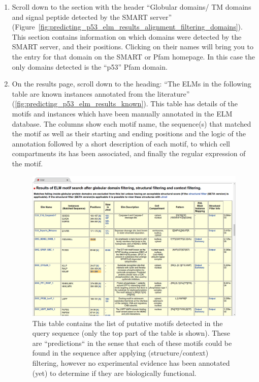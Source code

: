 \documentclass[12pt]{article}
\begin{document}
\begin{enumerate}
\item Scroll down to the section with the header ``Globular domains/ TM domains
	and signal peptide detected by the SMART server''
	(Figure~\ref{fig:predicting_p53_elm_results_alignment_filtering_domains}).
	This section contains information on which domains were detected by the
	SMART server, and their positions. Clicking on their names will bring
	you to the entry for that domain on the SMART or Pfam homepage.
	In this case the only domains detected is the ``p53'' Pfam domain.

\item On the results page, scroll down to the heading: ``The ELMs in the
	following table are known instances annotated from the literature''
	(\ref{fig:predicting_p53_elm_results_known}).
	This table has details of the motifs and instances which have been
	manually annotated in the ELM database. The columns show each motif
	name, the sequence(s) that matched the motif as well as their starting
	and ending positions and the logic of the annotation followed by a
	short description of each motif, to which cell compartments its has
	been associated, and finally the regular expression of the motif.

\begin{figure}[h!]
	\centering
	\includegraphics[width=\textwidth]{Figures/predicting_p53/elm_results_motifs.png}
	\caption{
	This table contains the list of putative motifs detected in the query sequence (only
	the top part of the table is shown). These are ``predictions`` in the sense
	that each of these motifs could be found in the sequence after applying (structure/context) filtering, however no experimental evidence has been annotated (yet) to determine if they are biologically functional.
	}
	\label{fig:predicting_p53_elm_results_motifs}
\end{figure}


\end{enumerate}
\end{document}
